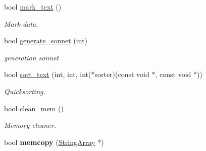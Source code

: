 \begin{DoxyCompactItemize}
bool \mbox{\hyperlink{class_string_array_acf2d98a2d86af02293de4bbe186b9f07}{mark\+\_\+text}} ()
\begin{DoxyCompactList}\small\item\em Mark data. \end{DoxyCompactList}\item 
bool \mbox{\hyperlink{class_string_array_a5ece78845303559bcbbddac65fd43d0e}{generate\+\_\+sonnet}} (int)
\begin{DoxyCompactList}\small\item\em generation sonnet \end{DoxyCompactList}\item 
bool \mbox{\hyperlink{class_string_array_afd5f7bae579321f7c9dc48f8417f29e6}{sort\+\_\+text}} (int, int, int($\ast$sorter)(const void $\ast$, const void $\ast$))
\begin{DoxyCompactList}\small\item\em Quicksorting. \end{DoxyCompactList}\item 
\mbox{\label{class_string_array_ac12898da93f759f656e3e450ffa1d881}} 
bool \mbox{\hyperlink{class_string_array_ac12898da93f759f656e3e450ffa1d881}{clean\+\_\+mem}} ()
\begin{DoxyCompactList}\small\item\em Memory cleaner. \end{DoxyCompactList}\item 
\mbox{\label{class_string_array_a19c573a7f0c267d9a24409a815caa64e}} 
bool {\bfseries memcopy} (\mbox{\hyperlink{class_string_array}{String\+Array}} $\ast$)
\end{DoxyCompactItemize}
